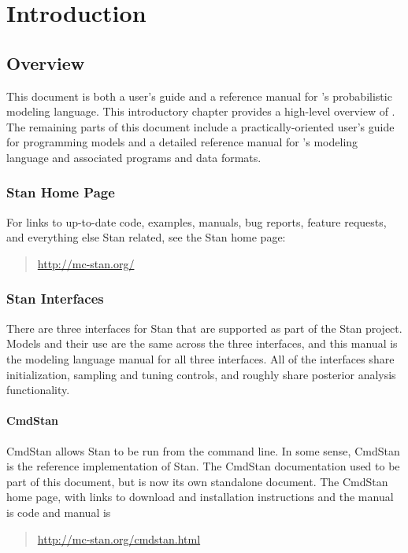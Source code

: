 \part{Introduction}


\chapter{Overview}

\noindent
This document is both a user's guide and a reference manual for
\Stan's probabilistic modeling language.  This introductory chapter
provides a high-level overview of \Stan. The remaining
parts of this document include a practically-oriented user's guide for
programming models and a detailed reference manual for \Stan's
modeling language and associated programs and data formats.

\section{Stan Home Page}

For links to up-to-date code, examples, manuals, bug reports,
feature requests, and everything else Stan related, see
the Stan home page:
%
\begin{quote}
\url{http://mc-stan.org/}
\end{quote}


\section{Stan Interfaces}

There are three interfaces for Stan that are supported as part of the
Stan project.  Models and their use are the same across the three
interfaces, and this manual is the modeling language manual for all
three interfaces.  All of the interfaces share initialization,
sampling and tuning controls, and roughly share posterior analysis
functionality.   

\subsection{CmdStan}

CmdStan allows Stan to be run from the command line.  In some sense,
CmdStan is the reference implementation of Stan.  The CmdStan
documentation used to be part of this document, but is now its own
standalone document.  The CmdStan home page, with links to download
and installation instructions and the manual is code and manual is
%
\begin{quote}
\url{http://mc-stan.org/cmdstan.html}
\end{quote}


